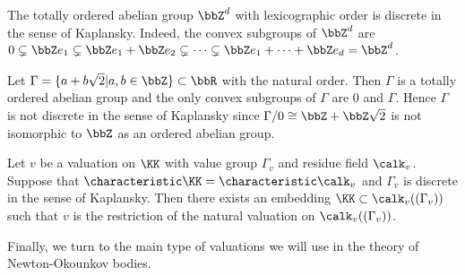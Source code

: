 \begin{example}
	The totally ordered abelian group $\bbZ^d$ with lexicographic order is discrete in the sense of Kaplansky.
	Indeed, the convex subgroups of $\bbZ^d$ are $0 \subsetneq \bbZ e_1 \subsetneq \bbZ e_1 + \bbZ e_2 \subsetneq \cdots \subsetneq \bbZ e_1 + \cdots + \bbZ e_d = \bbZ^d$.
\end{example}

\begin{example}
	Let $\Gamma = \{a + b \sqrt{2} | a,b \in \bbZ\} \subset \bbR$ with the natural order.
	Then $\Gamma$ is a totally ordered abelian group and the only convex subgroups of $\Gamma$ are $0$ and $\Gamma$.
	Hence $\Gamma$ is not discrete in the sense of Kaplansky since $\Gamma/0 \cong \bbZ + \bbZ\sqrt{2}$ is not isomorphic to $\bbZ$ as an ordered abelian group.
\end{example}

\begin{theorem}\label{thm:embedding_theorem_of_Kaplansky}
	Let $v$ be a valuation on $\KK$ with value group $\Gamma_v$ and residue field $\calk_v$.
	Suppose that $\characteristic \KK = \characteristic \calk_v$ and $\Gamma_v$ is discrete in the sense of Kaplansky.
	Then there exists an embedding $\KK \subset \calk_v((\Gamma_v))$ such that $v$ is the restriction of the natural valuation on $\calk_v((\Gamma_v))$.
\end{theorem}

Finally, we turn to the main type of valuations we will use in the theory of Newton-Okounkov bodies.



